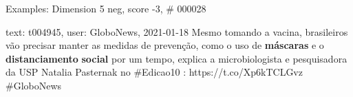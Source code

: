 \begin{frame}{Examples: Dimension 5 neg, score -3, \# 000028}
\footnotesize
\begin{alertblock}{text: t004945, user: GloboNews, 2021-01-18}
Mesmo tomando a vacina, brasileiros vão precisar manter as medidas de 
prevenção, como o uso de \textbf{máscaras} e o \textbf{distanciamento} 
\textbf{social} por um tempo, explica a microbiologista e pesquisadora da USP 
Natalia Pasternak no \#Edicao10 : https://t.co/Xp6kTCLGvz \#GloboNews 
\end{alertblock}
\end{frame}
